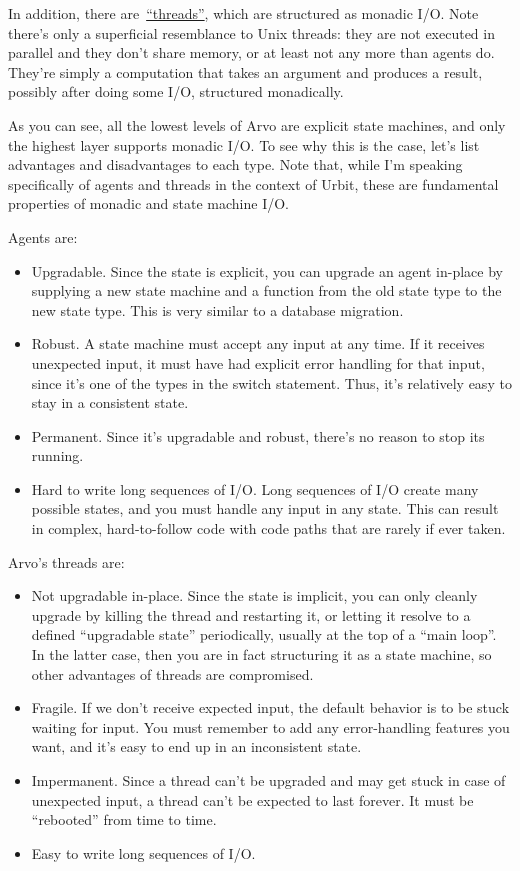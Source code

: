 \documentclass[twoside]{article}
\begin{document}
In addition, there
are~\href{https://developers.urbit.org/reference/glossary/thread}{``threads''},
which are structured as monadic I/O. Note there's only a superficial
resemblance to Unix threads: they are not executed in parallel and they
don't share memory, or at least not any more than agents do. They're
simply a computation that takes an argument and produces a result,
possibly after doing some I/O, structured monadically.

As you can see, all the lowest levels of Arvo are explicit state
machines, and only the highest layer supports monadic I/O. To see why
this is the case, let's list advantages and disadvantages to each type.
Note that, while I'm speaking specifically of agents and threads in the
context of Urbit, these are fundamental properties of monadic and state
machine I/O.

Agents are:

\begin{itemize}
\item
  Upgradable. Since the state is explicit, you can upgrade an agent
  in-place by supplying a new state machine and a function from the old
  state type to the new state type. This is very similar to a database
  migration.
\item
  Robust. A state machine must accept any input at any time. If it
  receives unexpected input, it must have had explicit error handling
  for that input, since it's one of the types in the switch statement.
  Thus, it's relatively easy to stay in a consistent state.
\item
  Permanent. Since it's upgradable and robust, there's no reason to stop
  its running.
\item
  Hard to write long sequences of I/O. Long sequences of I/O create many
  possible states, and you must handle any input in any state. This can
  result in complex, hard-to-follow code with code paths that are rarely
  if ever taken.
\end{itemize}

Arvo's threads are:

\begin{itemize}
\item
  Not upgradable in-place. Since the state is implicit, you can only
  cleanly upgrade by killing the thread and restarting it, or
  letting it resolve to a defined ``upgradable state'' periodically,
  usually at the top of a ``main loop''. In the latter case, then you are in
  fact structuring it as a state machine, so other advantages of
  threads are compromised.
\item
  Fragile. If we don't receive expected input, the default behavior is
  to be stuck waiting for input. You must remember to add any
  error-handling features you want, and it's easy to end up in an
  inconsistent state.
\item
  Impermanent. Since a thread can't be upgraded and may get stuck in
  case of unexpected input, a thread can't be expected to last forever.
  It must be ``rebooted'' from time to time.
\item
  Easy to write long sequences of I/O.
\end{itemize}
\end{document}
